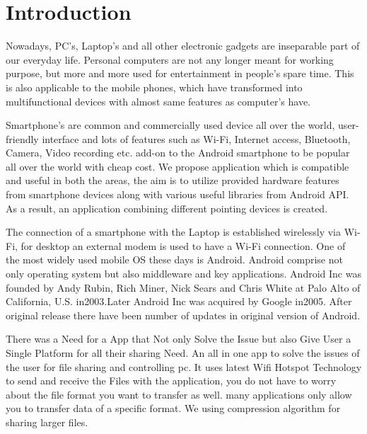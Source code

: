 \documentclass[12pt]{article}
\begin{document}
 \section{Introduction}\par
Nowadays, PC’s, Laptop’s and all other electronic gadgets are inseparable part of  our everyday life. Personal computers are not any longer meant for working  purpose, but more and more used for entertainment in people’s spare time. This is also applicable to the mobile phones, which have transformed into multifunctional devices with almost same features as computer’s have. \par
Smartphone's are common and commercially used device all over the world, user-
friendly interface and lots of features such as Wi-Fi, Internet access, Bluetooth,
Camera, Video recording etc. add-on to the Android smartphone to be popular all
over the world with cheap cost. We propose application which is compatible and
useful in both the areas, the aim is to utilize provided hardware features from
smartphone devices along with various useful libraries from Android API. As a
result, an application combining different pointing devices is created.\par 
The connection of a smartphone with the Laptop is established wirelessly via Wi-
Fi, for desktop an external modem is used to have a Wi-Fi connection. One of the
most widely used mobile OS these days is Android. Android comprise not only
operating system but also middleware and key applications. Android Inc was
founded by Andy Rubin, Rich Miner, Nick Sears and Chris White at Palo Alto of
California, U.S. in2003.Later Android Inc was acquired by Google in2005. After
original release there have been number of updates in original version of Android.\\[2mm]\par
There was a Need for a App that Not only Solve the Issue but also Give User a
Single Platform for all their sharing Need. An all in one app to solve the issues of
the user for file sharing and controlling pc. It uses latest Wifi Hotspot Technology
to send and receive the Files with the application, you do not have to worry about
the file format you want to transfer as well. many applications only allow you to
transfer data of a specific format. We using compression algorithm for sharing
larger files.\\[10mm]\par



\clearpage
\end{document}
